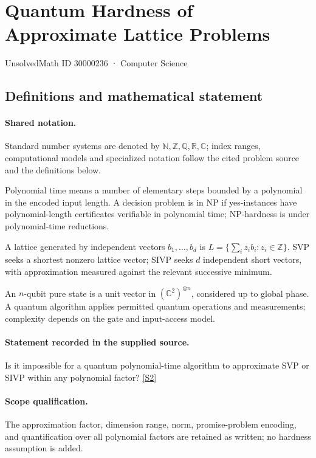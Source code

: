 \documentclass[11pt]{article}
\newcommand{\sref}[2]{\hyperlink{source:#1:#2}{[S#2]}}
\begin{document}
\setcounter{section}{30000235}
\section{Quantum Hardness of Approximate Lattice Problems}\label{30000236}
{\small\sffamily UnsolvedMath ID 30000236 · Computer Science}
\subsection{Definitions and mathematical statement}

\paragraph{Shared notation.}Standard number systems are denoted by $\mathbb N,\mathbb Z,\mathbb Q,\mathbb R,\mathbb C$; index ranges, computational models and specialized notation follow the cited problem source and the definitions below.


Polynomial time means a number of elementary steps bounded by a polynomial in the encoded input length. A decision problem is in $\mathrm{NP}$ if yes-instances have polynomial-length certificates verifiable in polynomial time; NP-hardness is under polynomial-time reductions.

A lattice generated by independent vectors $b_1,\ldots,b_d$ is $L=\{\sum_i z_i b_i:z_i\in\mathbb Z\}$. SVP seeks a shortest nonzero lattice vector; SIVP seeks $d$ independent short vectors, with approximation measured against the relevant successive minimum.

An $n$-qubit pure state is a unit vector in $(\mathbb C^2)^{\otimes n}$, considered up to global phase. A quantum algorithm applies permitted quantum operations and measurements; complexity depends on the gate and input-access model.
\paragraph{Statement recorded in the supplied source.}
Is it impossible for a quantum polynomial-time algorithm to approximate SVP or SIVP within any polynomial factor? \sref{30000236}{2}
\paragraph{Scope qualification.}
The approximation factor, dimension range, norm, promise-problem encoding, and quantification over all polynomial factors are retained as written; no hardness assumption is added.
\end{document}
